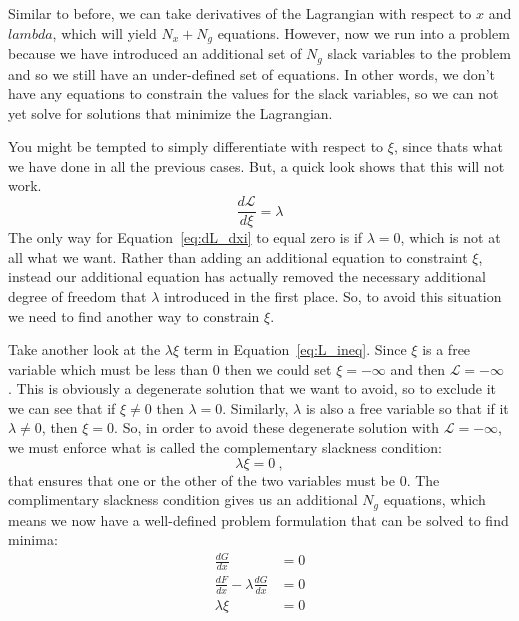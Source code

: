 \documentclass[conf]{new-aiaa}
\begin{document}
        Similar to before, we can take derivatives of the Lagrangian with respect to $x$ and $lambda$, which will yield 
        $N_x+N_g$ equations. 
        However, now we run into a problem because we have introduced an additional set of $N_g$ slack variables to the problem and so we still have an under-defined set of equations. 
        In other words, we don't have any equations to constrain the values for the slack variables, so we can not yet solve for solutions that minimize the Lagrangian. 

        You might be tempted to simply differentiate with respect to $\xi$, since thats what we have done in all the previous cases. 
        But, a quick look shows that this will not work.
        \begin{equation}
            \frac{d\mathcal{L}}{d\xi} = \lambda \label{eq:dL_dxi}
        \end{equation}
        The only way for Equation~\eqref{eq:dL_dxi} to equal zero is if $\lambda=0$, which is not at all what we want. 
        Rather than adding an additional equation to constraint $\xi$, instead our additional equation has actually removed the necessary additional degree of freedom that $\lambda$ introduced in the first place. 
        So, to avoid this situation we need to find another way to constrain $\xi$. 

        Take another look at the $\lambda \xi$ term in Equation~\eqref{eq:L_ineq}. 
        Since $\xi$ is a free variable which must be less than 0 then we could set $\xi=-\infty$ and then $\mathcal{L}=-\infty$
        . 
        This is obviously a degenerate solution that we want to avoid, so to exclude it we can see that if $\xi \ne 0$ then $\lambda = 0$. 
        Similarly, $\lambda$ is also a free variable so that if it $\lambda\ne0$, then $\xi=0$. 
        So, in order to avoid these degenerate solution with $\mathcal{L}=-\infty$, we must enforce what is called the complementary slackness condition: 
        \begin{equation}
            \lambda \xi = 0 \ , 
        \end{equation}
        that ensures that one or the other of the two variables must be 0. 
        The complimentary slackness condition gives us an additional $N_g$ equations, which means we now have a well-defined problem formulation that can be solved to find minima: 
        \begin{align}
            \frac{dG}{dx} &= 0 \\
            \frac{dF}{dx} - \lambda \frac{dG}{dx} &= 0 \\
            \lambda \xi &= 0
        \end{align}
\end{document}
